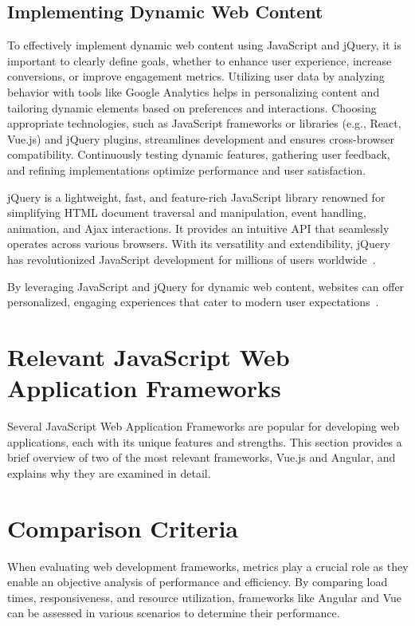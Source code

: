 \subsection{Implementing Dynamic Web Content}

To effectively implement dynamic web content using JavaScript and jQuery, it is important to clearly define goals, whether to enhance user experience, increase conversions, or improve engagement metrics. Utilizing user data by analyzing behavior with tools like Google Analytics helps in personalizing content and tailoring dynamic elements based on preferences and interactions. Choosing appropriate technologies, such as JavaScript frameworks or libraries (e.g., React, Vue.js) and jQuery plugins, streamlines development and ensures cross-browser compatibility. Continuously testing dynamic features, gathering user feedback, and refining implementations optimize performance and user satisfaction.

jQuery is a lightweight, fast, and feature-rich JavaScript library renowned for simplifying HTML document traversal and manipulation, event handling, animation, and Ajax interactions. It provides an intuitive API that seamlessly operates across various browsers. With its versatility and extendibility, jQuery has revolutionized JavaScript development for millions of users worldwide~\cite{jquery_history}.

By leveraging JavaScript and jQuery for dynamic web content, websites can offer personalized, engaging experiences that cater to modern user expectations~\cite{moldstud2024}.

\section{Relevant JavaScript Web Application Frameworks}

Several JavaScript Web Application Frameworks are popular for developing web applications, each with its unique features and strengths. This section provides a brief overview of two of the most relevant frameworks, Vue.js and Angular, and explains why they are examined in detail.

\section {Comparison Criteria}

When evaluating web development frameworks, metrics play a crucial role as they enable an objective analysis of performance and efficiency. By comparing load times, responsiveness, and resource utilization, frameworks like Angular and Vue can be assessed in various scenarios to determine their performance.


